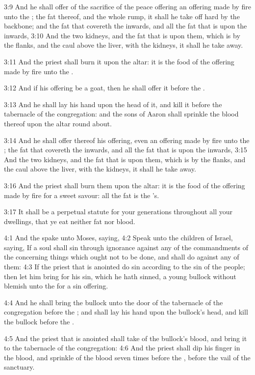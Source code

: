 3:9 And he shall offer of the sacrifice of the peace offering an
offering made by fire unto the \LORD; the fat thereof, and the whole
rump, it shall he take off hard by the backbone; and the fat that
covereth the inwards, and all the fat that is upon the inwards, 3:10
And the two kidneys, and the fat that is upon them, which is by the
flanks, and the caul above the liver, with the kidneys, it shall he
take away.

3:11 And the priest shall burn it upon the altar: it is the food of
the offering made by fire unto the \LORD.

3:12 And if his offering be a goat, then he shall offer it before the
\LORD.

3:13 And he shall lay his hand upon the head of it, and kill it before
the tabernacle of the congregation: and the sons of Aaron shall
sprinkle the blood thereof upon the altar round about.

3:14 And he shall offer thereof his offering, even an offering made by
fire unto the \LORD; the fat that covereth the inwards, and all the fat
that is upon the inwards, 3:15 And the two kidneys, and the fat that
is upon them, which is by the flanks, and the caul above the liver,
with the kidneys, it shall he take away.

3:16 And the priest shall burn them upon the altar: it is the food of
the offering made by fire for a sweet savour: all the fat is the
\LORD's.

3:17 It shall be a perpetual statute for your generations throughout
all your dwellings, that ye eat neither fat nor blood.

4:1 And the \LORD spake unto Moses, saying, 4:2 Speak unto the children
of Israel, saying, If a soul shall sin through ignorance against any
of the commandments of the \LORD concerning things which ought not to
be done, and shall do against any of them: 4:3 If the priest that is
anointed do sin according to the sin of the people; then let him bring
for his sin, which he hath sinned, a young bullock without blemish
unto the \LORD for a sin offering.

4:4 And he shall bring the bullock unto the door of the tabernacle of
the congregation before the \LORD; and shall lay his hand upon the
bullock's head, and kill the bullock before the \LORD.

4:5 And the priest that is anointed shall take of the bullock's blood,
and bring it to the tabernacle of the congregation: 4:6 And the priest
shall dip his finger in the blood, and sprinkle of the blood seven
times before the \LORD, before the vail of the sanctuary.

